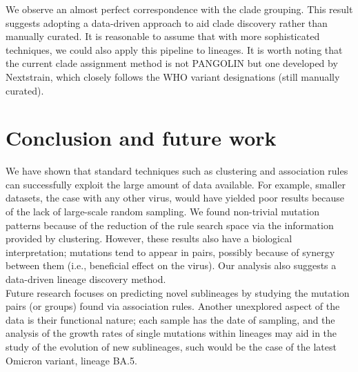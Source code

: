 \documentclass[twoside,twocolumn]{article}
\begin{document}
	We observe an almost perfect correspondence with the clade grouping. This result suggests adopting a data-driven approach to aid clade discovery rather than manually curated. It is reasonable to assume that with more sophisticated techniques, we could also apply this pipeline to lineages. 
	It is worth noting that the current clade assignment method is not PANGOLIN but one developed by Nextstrain\cite{cladeassignment}, which closely follows the WHO variant designations (still manually curated). 
	\section{Conclusion and future work}
	We have shown that standard techniques such as clustering and association rules can successfully exploit the large amount of data available. For example, smaller datasets, the case with any other virus, would have yielded poor results because of the lack of large-scale random sampling. We found non-trivial mutation patterns because of the reduction of the rule search space via the information provided by clustering. However, these results also have a biological interpretation; mutations tend to appear in pairs, possibly because of synergy between them (i.e., beneficial effect on the virus). Our analysis also suggests a data-driven lineage discovery method. 	
	\\
	Future research focuses on predicting novel sublineages by studying the mutation pairs (or groups) found via association rules. Another unexplored aspect of the data is their functional nature; each sample has the date of sampling, and the analysis of the growth rates of single mutations within lineages may aid in the study of the evolution of new sublineages, such would be the case of the latest Omicron variant, lineage BA.5.
	\newpage
\end{document}
